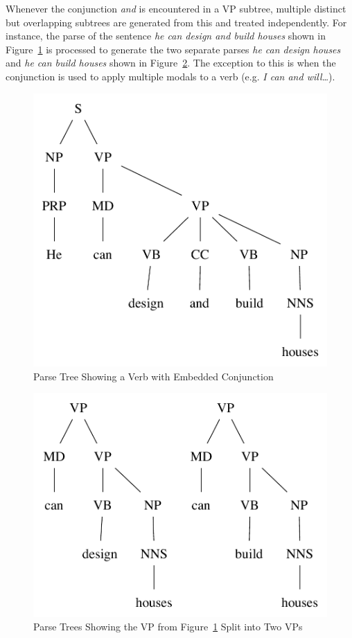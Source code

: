 \documentclass[main.tex]{subfiles}
\begin{document}
Whenever the conjunction \textit{and} is encountered in a VP subtree, multiple distinct but overlapping subtrees are generated from this and treated independently. For instance, the parse of the sentence \textit{he can design and build houses} shown in Figure~\ref{fig:conj-verb} is processed to generate the two separate parses \textit{he can design houses} and \textit{he can build houses} shown in Figure~\ref{fig:conj-verb-ab}. The exception to this is when the conjunction is used to apply multiple modals to a verb (e.g. \textit{I can and will\ldots}).
\begin{figure}[htbp]
\centering
\includegraphics[scale=0.6]{conj-verb.pdf}
\caption{Parse Tree Showing a Verb with Embedded Conjunction}
\label{fig:conj-verb}
\end{figure}

\begin{figure}[htbp]
\centering
\includegraphics[scale=0.6]{conj-verb-ab.pdf}
\caption{Parse Trees Showing the VP from Figure~\ref{fig:conj-verb} Split into Two VPs}
\label{fig:conj-verb-ab}
\end{figure}
\end{document}
